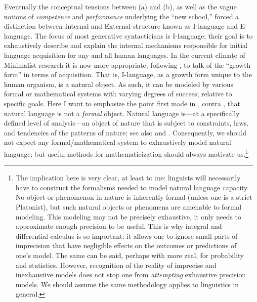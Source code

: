 \documentclass[11pt,twoside]{article}
\begin{document}
Eventually the conceptual tensions  between (a) and (b), as well as the vague notions of \emph{competence} and \emph{performance} underlying the ``new school,'' forced a distinction between Internal and External structure known as I-language and E-language. The focus of most generative syntacticians is I-language; their goal is to exhaustively describe and explain the internal mechanisms responsible for initial language acquisition for any and all human languages. In the current climate of Minimalist research it is now more appropriate, following \cite{ppuriagereka:2008}, to talk of the ``growth form'' in terms of acquisition. That is, I-language, as a growth form unique to the human organism, is a natural object. As such, it can be modeled by various formal or mathematical systems with varying degrees of success; relative to specific goals. Here I want to emphasize the point first made in \cite{chomsky55logicalsyntax}, contra \cite{barhillel:1954}, that natural language is not a \emph{formal} object. Natural language is---at a specifically defined level of analysis---an object of nature that is subject to constraints, laws, and tendencies of the patterns of nature; see also \cite{chomsky95langnature} and \cite{boeckxpp:2005}. Consequently, we should not expect any formal/mathematical system to exhaustively model natural language; but useful methods for mathematicization should always motivate us.\footnote{The implication here is very clear, at least to me: linguists will necessarily have to construct the formalisms needed to model natural language capacity. No object or phenomenon in nature is inherently formal (unless one is a strict Platonist), but such natural objects or phenomena are amenable to formal modeling. This modeling may not be precisely exhaustive, it only needs to approximate enough precision to be useful. This is why integral and differential calculus is so important: it allows one to ignore small parts of imprecision that have negligible effects on the outcomes or predictions of one's model. The same can be said, perhaps with more zeal, for probability and statistics. However, recognition of the reality of imprecise and inexhaustive models does not stop one from {\sl attempting} exhaustive precision models. We should assume the same methodology applies to linguistics in general.}
\end{document}
